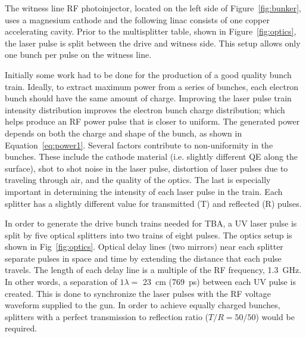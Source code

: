 The witness line RF photoinjector, located on the left side of Figure~\ref{fig:bunker}, 
uses a magnesium cathode and the following linac consists of one copper
accelerating cavity. Prior to the multisplitter table, shown in
Figure~\ref{fig:optics}, the laser pulse is split between the drive and witness side.
This setup allows only one bunch per pulse on the witness line. 

\label{sec:uvoptics}

Initially some work had to be done for the production of a good quality  bunch train. Ideally, to extract maximum power from a series of bunches, each electron bunch should have the same amount of charge.  Improving the laser pulse train intensity distribution improves the electron bunch charge distribution; 
which  helps produce an RF power pulse that is closer to uniform. 
The generated power depends on both the charge and shape of the bunch, as shown in Equation~\ref{eq:power1}. 
Several factors contribute to non-uniformity in the bunches. These include the cathode material
(i.e. slightly different QE along the surface), shot to shot noise in the laser pulse, 
distortion of laser pulses due to traveling through air, and the quality of the optics. 
The last is especially important in determining the intensity of each laser pulse in the train.  
Each splitter has a slightly different value for transmitted (T) and reflected (R) pulses. 

In order to generate the drive bunch trains needed for TBA, a UV laser pulse is split 
by five optical splitters into two trains of eight pulses. 
The optics setup is shown in Fig~\ref{fig:optics}. Optical delay lines (two mirrors) near each splitter 
separate pulses in space and time by extending the distance that each pulse travels. 
The length of each delay line is a multiple of the RF frequency, \SI{1.3}{GHz}. 
In other words, a separation of $1\lambda=$ \SI{23}{cm} (\SI{769}{ps}) between each UV pulse is created. 
This is done to synchronize the laser pulses with the RF voltage waveform supplied to the gun.
In order to achieve equally charged bunches, splitters with a perfect transmission 
to reflection ratio ($T/R = 50/50$) would be required.

